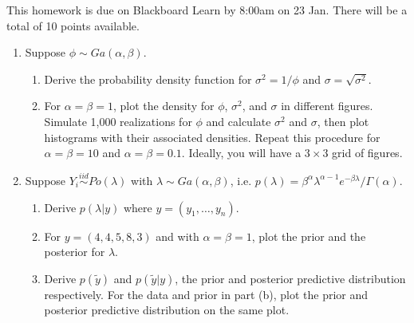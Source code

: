 \documentclass[12pt]{article}\usepackage[]{graphicx}\usepackage[]{color}
\begin{document}

This homework is due on Blackboard Learn by 8:00am on 23 Jan. There will be a total of 10 points available. 

\begin{enumerate}
\item Suppose $\phi\sim Ga(\alpha,\beta)$. 
	\begin{enumerate}
	\item Derive the probability density function for $\sigma^2 = 1/\phi$ and $\sigma = \sqrt{\sigma^2}$. 
	\item For $\alpha=\beta=1$, plot the density for $\phi$, $\sigma^2$, and $\sigma$ in different figures. Simulate 1,000 realizations for $\phi$ and calculate $\sigma^2$ and $\sigma$, then plot histograms with their associated densities. Repeat this procedure for $\alpha=\beta=10$ and $\alpha=\beta=0.1$. Ideally, you will have a $3\times 3$ grid of figures.
	\end{enumerate}

\item Suppose $Y_i\stackrel{iid}{\sim} Po(\lambda)$ with $\lambda \sim Ga(\alpha,\beta)$, i.e. $p(\lambda) = \beta^{\alpha} \lambda^{\alpha-1}e^{-\beta \lambda}/\Gamma(\alpha)$.
	\begin{enumerate}
	\item Derive $p(\lambda|y)$ where $y=(y_1,\ldots,y_n)$. 
	\item For $y=(4, 4, 5, 8, 3)$ and with $\alpha=\beta=1$, plot the prior and the posterior for $\lambda$. 
	\item Derive $p(\tilde{y})$ and $p(\tilde{y}|y)$, the prior and posterior predictive distribution respectively. For the data and prior in part (b), plot the prior and posterior predictive distribution on the same plot. 
	\end{enumerate}

\end{enumerate}
\end{document}
